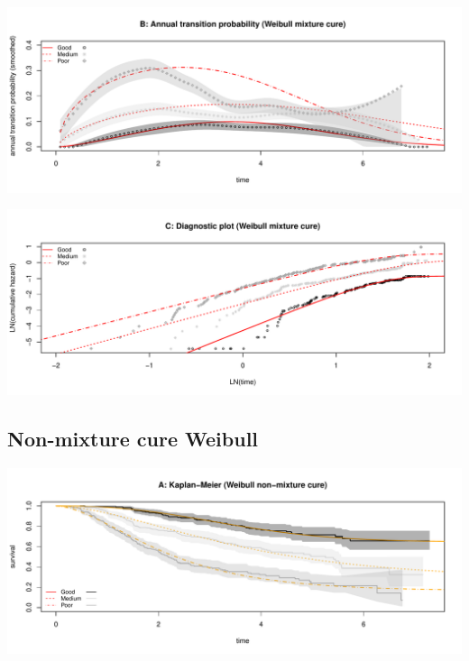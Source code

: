 \documentclass[]{article}
\begin{document}
\begin{flushleft}\includegraphics[height=0.25\textheight]{Images/cure_weib_mix-2} \end{flushleft}

\begin{flushleft}\includegraphics[height=0.25\textheight]{Images/cure_weib_mix-3} \end{flushleft}

\newpage

\subsection{Non-mixture cure Weibull}\label{non-mixture-cure-weibull}

\begin{flushleft}\includegraphics[height=0.25\textheight]{Images/cure_weib_nmix-1} \end{flushleft}
\end{document}
